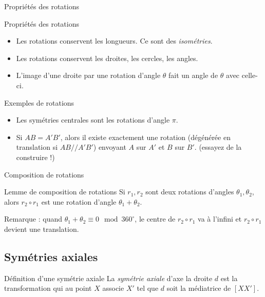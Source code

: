 \documentclass[french]{beamer}
\theoremstyle{plain}
\begin{document}
\begin{frame}{Propriétés des rotations}
  \begin{exampleblock}{Propriétés des rotations}
    \begin{itemize}
      \item Les rotations conservent les longueurs. Ce sont des \textit{isométries}.
      \item Les rotations conservent les droites, les cercles, les angles.
      \item L’image d’une droite par une rotation d’angle $ \theta $ fait un angle de $ \theta $ avec celle-ci.
    \end{itemize}
  \end{exampleblock}
\end{frame}


\begin{frame}{Exemples de rotations}
  \begin{itemize}
    \item Les symétries centrales sont les rotations d'angle $ \pi $.
    \item Si $ AB = A'B' $, alors il existe exactement une rotation (dégénérée en translation si $ AB /\!/ A'B' $) envoyant $ A $ sur $ A'$ et $ B $ sur $ B' $. (essayez de la construire !)
  \end{itemize}
\end{frame}


\begin{frame}{Composition de rotations}
  \begin{exampleblock}{Lemme de composition de rotations}
    Si $ r_1, r_2 $ sont deux rotations d'angles $ \theta_1, \theta_2 $, alors $ r_2 \circ r_1 $ est une rotation d'angle $ \theta_1 + \theta_2 $.
  \end{exampleblock}
  Remarque : quand $ \theta_1 + \theta_2 \equiv 0 \mod 360^\circ $, le centre de $ r_2 \circ r_1 $ va à l'infini et $ r_2 \circ r_1 $ devient une translation.
\end{frame}


\subsection{Symétries axiales}
\begin{frame}{Définition d'une symétrie axiale}
  La \textit{symétrie axiale} d'axe la droite $ d $ est la transformation qui au point $ X $ associe $ X' $ tel que $ d $ soit la médiatrice de $ [XX'] $.
\end{frame}
\end{document}
